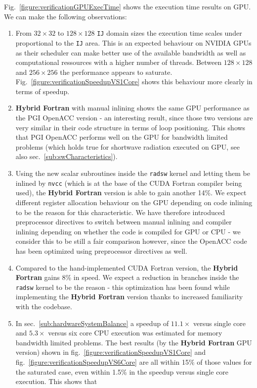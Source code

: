 Fig.~\ref{figure:verificationGPUExecTime} shows the execution time results on GPU. We can make the following observations:
\begin{enumerate}
 \item From $32\times32$ to $128\times128$ \verb|IJ| domain sizes the execution time scales under proportional to the \verb|IJ| area. This is an expected behaviour on NVIDIA GPUs as their scheduler can make better use of the available bandwidth as well as computational ressources with a higher number of threads. Between $128\times128$ and $256\times256$ the performance appears to saturate. Fig.~\ref{figure:verificationSpeedupVS1Core} shows this behaviour more clearly in terms of speedup.
 \item \textbf{Hybrid Fortran} with manual inlining shows the same GPU performance as the PGI OpenACC version - an interesting result, since those two versions are very similar in their code structure in terms of loop positioning. This shows that PGI OpenACC performs well on the GPU for bandwidth limited problems (which holds true for shortwave radiation executed on GPU, see also sec.~\ref{sub:swCharacteristics}).
 \item Using the new scalar subroutines inside the \verb|radsw| kernel and letting them be inlined by \verb|nvcc| (which is at the base of the CUDA Fortran compiler being used), the \textbf{Hybrid Fortran} version is able to gain another 14\%. We expect different register allocation behaviour on the GPU depending on code inlining to be the reason for this characteristic. We have therefore introduced preprocessor directives to switch between manual inlining and compiler inlining depending on whether the code is compiled for GPU or CPU - we consider this to be still a fair comparison however, since the OpenACC code has been optimized using preprocessor directives as well.
 \item Compared to the hand-implemented CUDA Fortran version, the \textbf{Hybrid Fortran} gains 8\% in speed. We expect a reduction in branches inside the \verb|radsw| kernel to be the reason - this optimization has been found while implementing the \textbf{Hybrid Fortran} version thanks to increased familiarity with the codebase.
 \item In sec.~\ref{sub:hardwareSystemBalance} a speedup of $11.1\times$ versus single core and $5.3\times$ versus six core CPU execution was estimated for memory bandwidth limited problems. The best results (by the \textbf{Hybrid Fortran} GPU version) shown in fig.~\ref{figure:verificationSpeedupVS1Core} and fig.~\ref{figure:verificationSpeedupVS6Core} are all within 15\% of those values for the saturated case, even within 1.5\% in the speedup versus single core execution. This shows that

\end{enumerate}
